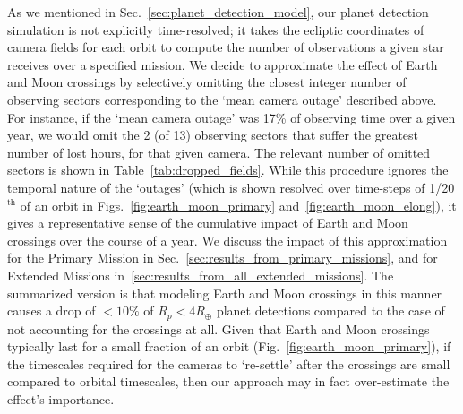 As we mentioned in Sec.~\ref{sec:planet_detection_model}, our planet detection simulation is not explicitly time-resolved; it takes the ecliptic coordinates of camera fields for each orbit to compute the number of observations a given star receives over a specified mission.
We decide to approximate the effect of Earth and Moon crossings by selectively omitting the closest integer number of observing sectors corresponding to the `mean camera outage' described above.
For instance, if the `mean camera outage' was 17\% of \tesss observing time over a given year, we would omit the 2 (of 13) observing sectors that suffer the greatest number of lost hours, for that given camera.
The relevant number of omitted sectors is shown in Table~\ref{tab:dropped_fields}.
While this procedure ignores the temporal nature of the `outages' (which is shown resolved over time-steps of 1/20$^\mathrm{th}$ of an orbit in Figs.~\ref{fig:earth_moon_primary} and~\ref{fig:earth_moon_elong}), it gives a representative sense of the cumulative impact of Earth and Moon crossings over the course of a year.
We discuss the impact of this approximation for the Primary Mission in Sec.~\ref{sec:results_from_primary_missions}, and for Extended Missions in~\ref{sec:results_from_all_extended_missions}.
The summarized version is that modeling Earth and Moon crossings in this manner causes a drop of $<10\%$ of $R_p < 4R_\oplus$ planet detections compared to the case of not accounting for the crossings at all.
Given that Earth and Moon crossings typically last for a small fraction of an orbit (Fig.~\ref{fig:earth_moon_primary}), if the timescales required for the cameras to `re-settle' after the crossings are small compared to orbital timescales, then our approach may in fact over-estimate the effect's importance.

